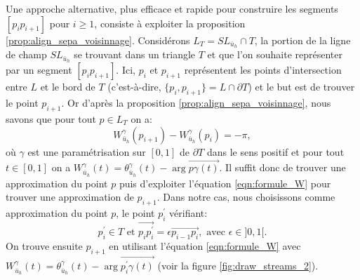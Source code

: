 Une approche alternative, plus efficace et rapide pour construire les segments $[p_ip_{i+1}]$ pour $i\geq 1$, consiste à exploiter la proposition \ref{prop:align_sepa_voisinnage}. Considérons $L_T=SL_{\bar{u}_h}\cap T$, la portion de la ligne de champ $SL_{\bar{u}_h}$ se trouvant dans un triangle $T$ et que l'on souhaite représenter par un segment $[p_ip_{i+1}]$. Ici, $p_i$ et $p_{i+1}$ représentent les points d'intersection entre $L$ et le bord de $T$ (c'est-à-dire, $\{p_i, p_{i+1}\}=L\cap\partial T$) et le but est de trouver le point $p_{i+1}$. Or d'après la proposition \ref{prop:align_sepa_voisinnage}, nous savons que pour tout $p\in L_T$ on a:
\begin{equation}
W^\gamma_{\bar{u}_h}(p_{i+1})-W^\gamma_{\bar{u}_h}(p_i)=-\pi,
\label{eqn:formule_W}
\end{equation}
où $\gamma$ est une paramétrisation sur $[0, 1]$ de $\partial T$ dans le sens positif et pour tout $t\in[0, 1]$ on a $W^\gamma_{\bar{u}_h}(t)=\theta_{\bar{u}_h}^\gamma(t)-\arg{\overrightarrow{p\gamma(t)}}$. Il suffit donc de trouver une approximation du point $p$ puis d'exploiter l'équation \ref{eqn:formule_W} pour trouver une approximation de $p_{i+1}$. Dans notre cas, nous choisissons comme approximation du point $p$, le point $p_i^{'}$ vérifiant:
$$
p_i^{'}\in T\mbox{ et }\overrightarrow{p_ip_i^{'}}=\epsilon\overrightarrow{p_{i-1}p_i}, \mbox{ avec }\epsilon\in]0, 1[.
$$
On trouve ensuite $p_{i+1}$ en utilisant l'équation \ref{eqn:formule_W} avec $W^\gamma_{\bar{u}_h}(t)=\theta_{\bar{u}_h}^\gamma(t)-\arg{\overrightarrow{p_i^{'}\gamma(t)}}$ (voir la figure \ref{fig:draw_streams_2}).

